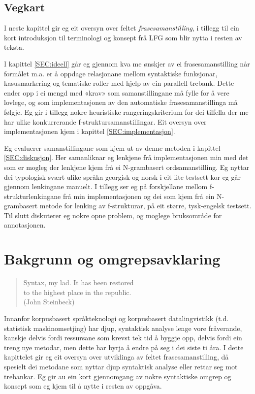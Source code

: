 \documentclass[12pt,a4paper,oneside,draft]{report}
\newcommand{\q}[2]{\begin{quotation}\raggedleft{}#1\\\vspace{0.2cm}(#2)\vspace{1.2cm}\end{quotation}}
\begin{document}
\section{Vegkart}
\label{sec-1.1}

I neste kapittel gir eg eit oversyn over feltet \emph{frasesamanstilling},
i tillegg til ein kort introduksjon til terminologi og konsept frå
LFG som blir nytta i resten av teksta.

I kapittel \ref{SEC:ideell} går eg gjennom kva me ønskjer av ei
frasesamanstilling når formålet m.a. er å oppdage relasjonane mellom
syntaktiske funksjonar, kasusmarkering og tematiske roller med hjelp
av ein parallell trebank. Dette ender opp i ei mengd med «krav» som
samanstillingane må fylle for å vere lovlege, og som implementasjonen
av den automatiske frasesamanstillinga må følgje. Eg gir i tillegg
nokre heuristiske rangeringskriterium for dei tilfella der me har
ulike konkurrerande f\hyp{}struktursamanstillingar. Eit oversyn over
implementasjonen kjem i kapittel \ref{SEC:implementasjon}.

Eg evaluerer samanstillingane som kjem ut av denne metoden i kapittel
 \ref{SEC:diskusjon}. Her samanliknar eg lenkjene frå implementasjonen
 min med det som er mogleg der lenkjene kjem frå ei N-grambasert
 ordsamanstilling. Eg nyttar dei typologisk svært ulike språka
 georgisk og norsk i eit lite testsett kor eg går gjennom lenkingane
 manuelt. I tillegg ser eg på forskjellane mellom
 f\hyp{}strukturlenkingane frå min implementasjonen og dei som kjem
 frå ein N-grambasert metode for lenking av f\hyp{}strukturar, på eit
 større, tysk-engelsk testsett. Til slutt diskuterer eg nokre opne
 problem, og moglege bruksområde for annotasjonen.





\chapter{Bakgrunn og omgrepsavklaring}
\label{sec-2}

\label{SEC:bakgrunn}

   \q{Syntax, my lad. It has been restored\\ to the highest place in the
   republic.}
   {John Steinbeck}
  
Innanfor korpusbasert språkteknologi og korpusbasert datalingvistikk
 (t.d. statistisk maskinomsetjing) har djup, syntaktisk analyse lenge
 vore fråverande, kanskje delvis fordi ressursane som krevst tek tid å
 byggje opp, delvis fordi ein treng nye metodar, men dette har byrja å
 endre på seg i dei siste ti åra.  I dette kapittelet gir eg eit
 oversyn over utviklinga av feltet frasesamanstilling, då spesielt dei
 metodane som nyttar djup syntaktisk analyse eller rettar seg mot
 trebankar. Eg gir au ein kort gjennomgang av nokre syntaktiske omgrep
 og konsept som eg kjem til å nytte i resten av oppgåva.
\end{document}
